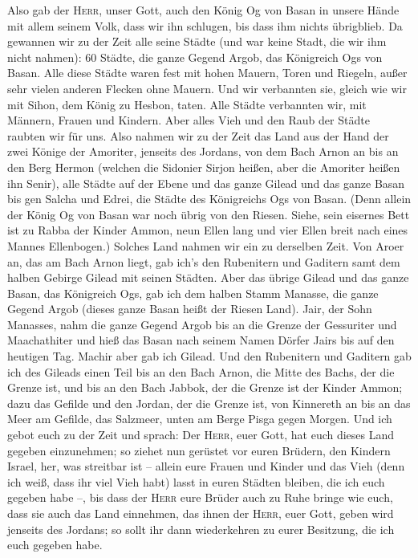  Also gab der \textsc{Herr}, unser Gott, auch den König Og
von Basan in unsere Hände mit allem seinem Volk, dass wir ihn schlugen,
bis dass ihm nichts übrigblieb.  Da gewannen wir zu der
Zeit alle seine Städte (und war keine Stadt, die wir ihm nicht nahmen):
60 Städte, die ganze Gegend Argob, das Königreich Ogs von Basan.
 Alle diese Städte waren fest mit hohen Mauern, Toren und
Riegeln, außer sehr vielen anderen Flecken ohne Mauern. 
Und wir verbannten sie, gleich wie wir mit Sihon, dem König zu Hesbon,
taten. Alle Städte verbannten wir, mit Männern, Frauen und Kindern.
 Aber alles Vieh und den Raub der Städte raubten wir für
uns.  Also nahmen wir zu der Zeit das Land aus der Hand
der zwei Könige der Amoriter, jenseits des Jordans, von dem Bach Arnon
an bis an den Berg Hermon  (welchen die Sidonier Sirjon
heißen, aber die Amoriter heißen ihn Senir),  alle Städte
auf der Ebene und das ganze Gilead und das ganze Basan bis gen Salcha
und Edrei, die Städte des Königreichs Ogs von Basan. 
(Denn allein der König Og von Basan war noch übrig von den Riesen.
Siehe, sein eisernes Bett ist zu Rabba der Kinder Ammon, neun Ellen lang
und vier Ellen breit nach eines Mannes Ellenbogen.) 
Solches Land nahmen wir ein zu derselben Zeit. Von Aroer an, das am Bach
Arnon liegt, gab ich's den Rubenitern und Gaditern samt dem halben
Gebirge Gilead mit seinen Städten.  Aber das übrige
Gilead und das ganze Basan, das Königreich Ogs, gab ich dem halben Stamm
Manasse, die ganze Gegend Argob (dieses ganze Basan heißt der Riesen
Land).  Jair, der Sohn Manasses, nahm die ganze Gegend
Argob bis an die Grenze der Gessuriter und Maachathiter und hieß das
Basan nach seinem Namen Dörfer Jairs bis auf den heutigen Tag.
 Machir aber gab ich Gilead.  Und den
Rubenitern und Gaditern gab ich des Gileads einen Teil bis an den Bach
Arnon, die Mitte des Bachs, der die Grenze ist, und bis an den Bach
Jabbok, der die Grenze ist der Kinder Ammon;  dazu das
Gefilde und den Jordan, der die Grenze ist, von Kinnereth an bis an das
Meer am Gefilde, das Salzmeer, unten am Berge Pisga gegen Morgen.
 Und ich gebot euch zu der Zeit und sprach: Der
\textsc{Herr}, euer Gott, hat euch dieses Land gegeben einzunehmen; so
ziehet nun gerüstet vor euren Brüdern, den Kindern Israel, her, was
streitbar ist --  allein eure Frauen und Kinder und das
Vieh (denn ich weiß, dass ihr viel Vieh habt) lasst in euren Städten
bleiben, die ich euch gegeben habe --,  bis dass der
\textsc{Herr} eure Brüder auch zu Ruhe bringe wie euch, dass sie auch
das Land einnehmen, das ihnen der \textsc{Herr}, euer Gott, geben wird
jenseits des Jordans; so sollt ihr dann wiederkehren zu eurer Besitzung,
die ich euch gegeben habe.

